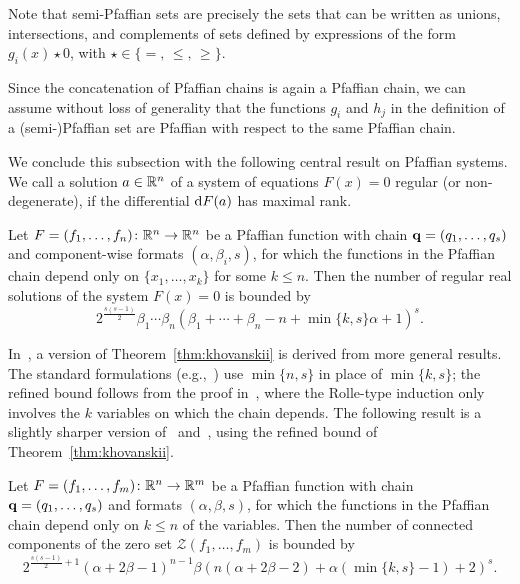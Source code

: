 Note that semi-Pfaffian sets are precisely the sets that can be written as unions, intersections, and complements of sets defined by expressions of the form $g_i(x) \star 0$, with $\star \in \{=,\, \leq,\, \geq\}$. 

\begin{remark}
  Since the concatenation of Pfaffian chains is again a Pfaffian chain, we can assume without loss of generality that the functions $g_i$ and $h_j$ in the definition of a (semi-)Pfaffian set are Pfaffian with respect to the same Pfaffian chain.
\end{remark} 

We conclude this subsection with the following central result on Pfaffian systems.
We call a solution $a\in \mathbb{R}^n$ of a system of equations $F(x)=0$ regular (or non-degenerate), if the differential $\mathrm{d}{F}(a)$ has maximal rank. 

\begin{theorem}[Khovanskii] \label{thm:khovanskii}
Let $F=(f_1,\dots,f_n) \colon \mathbb{R}^n\to \mathbb{R}^n$ be a Pfaffian function with chain $\mathbf{q}=(q_1,\dots,q_s)$ and component-wise formats $(\alpha, \beta_i, s)$, for which the functions in the Pfaffian chain depend only on $\{x_1,\dots,x_k\}$ for some $k\leq n$. Then the number of regular real solutions of the system $F(x) = 0$ is bounded by 
\begin{equation*}
2^{\frac{s(s - 1)}{2}} \beta_1 \dotsm \beta_n \left(\beta_1 + \dotsb + \beta_n - n + \min\{k, s\}\alpha + 1 \right)^s.
\end{equation*}
\end{theorem}

In~\cite[\S 3.12, Corollary 5]{khovanskiui1991fewnomials}, a version of Theorem~\ref{thm:khovanskii} is derived from more general results. The standard formulations (e.g.,~\cite[Theorem 3.1]{gabrielov2004complexity}) use $\min\{n,s\}$ in place of $\min\{k,s\}$; the refined bound follows from the proof in~\cite{khovanskiui1991fewnomials}, where the Rolle-type induction only involves the $k$ variables on which the chain depends. The following result is a slightly sharper version of~\cite[Corollary 3.3]{gabrielov2004complexity} and~\cite[Theorem 2.3]{jones2012density}, using the refined bound of Theorem~\ref{thm:khovanskii}.

\begin{corollary}
Let $F=(f_1,\dots,f_m) \colon \mathbb{R}^n \to \mathbb{R}^m$ be a Pfaffian function with chain $\mathbf{q}=(q_1,\dots,q_s)$ and formats $(\alpha, \beta, s)$, for which the functions in the Pfaffian chain depend only on $k\leq n$ of the variables. Then the number of connected components of the zero set $\mathcal{Z}(f_1,\dots,f_m)$ is bounded by 
\begin{equation}\label{eq:jones}
2^{\frac{s(s - 1)}{2}+1} (\alpha+2\beta-1)^{n-1}\beta \left( n (\alpha+2\beta-2)+\alpha(\min\{k, s\}-1) + 2 \right)^s.
\end{equation}
\end{corollary}

